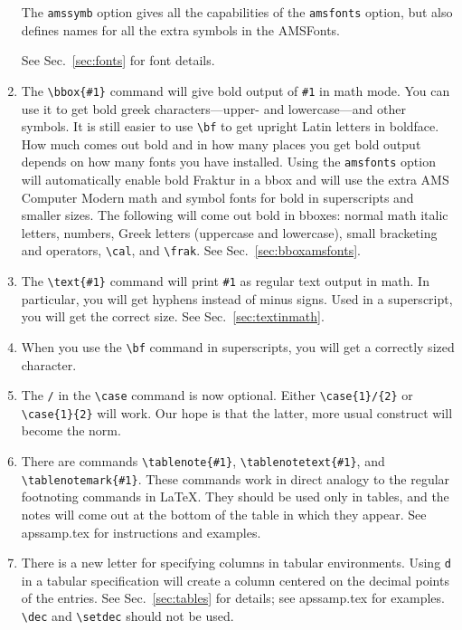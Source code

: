 \begin{enumerate}
The \verb+amssymb+ option gives all the capabilities of the \verb+amsfonts+
option, but also defines names for all the extra symbols in the AMSFonts.

See Sec.\ \ref{sec:fonts} for font details.

\item The \verb+\bbox{#1}+ command will give bold output of \verb+#1+ in
math mode. You can use it to get bold greek characters---upper- and
lowercase---and other symbols. It is still easier to use \verb+\bf+ to get
upright Latin letters in boldface. How much comes out bold and in how many
places you get bold output depends on how many fonts you have installed.
Using the \verb+amsfonts+ option will automatically enable bold Fraktur in
a bbox and will use the extra AMS Computer Modern math and symbol fonts for
bold in superscripts and smaller sizes. The following will come out bold in
bboxes: normal math italic letters, numbers, Greek letters (uppercase and
lowercase), small bracketing and operators, \verb+\cal+, and \verb+\frak+.
See Sec.\ \ref{sec:bboxamsfonts}.

\item The \verb+\text{#1}+ command will print \verb+#1+ as regular text
output in math. In particular, you will get hyphens instead of minus signs.
Used in a superscript, you will get the correct size. See Sec.\
\ref{sec:textinmath}.

\item When you use the \verb+\bf+ command in superscripts, you will get a
correctly sized character.

\item The \verb+/+ in the \verb+\case+ command is now optional. Either
\verb+\case{1}/{2}+ or \verb+\case{1}{2}+ will work. Our hope is that the
latter, more usual construct will become the norm.

\item There are commands \verb+\tablenote{#1}+, \verb+\tablenotetext{#1}+,
and \verb+\tablenotemark{#1}+. These commands work in direct analogy to the
regular footnoting commands in \LaTeX{}. They should be used only in
tables, and the notes will come out at the bottom of the table in which
they appear. See apssamp.tex for instructions and examples.

\item There is a new letter for specifying columns in tabular environments.
Using \verb+d+ in a tabular specification will create a column centered on
the decimal points of the entries. See Sec.\ \ref{sec:tables} for details;
see apssamp.tex for examples. \verb+\dec+ and \verb+\setdec+ should not be
used.


\end{enumerate}
